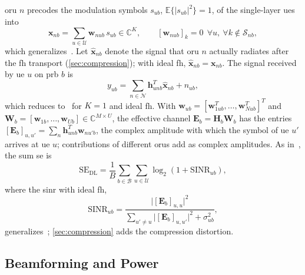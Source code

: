 \documentclass[10pt, final, journal, letterpaper, twocolumn]{IEEEtran}
\newcommand{\Nset}{\mathcal{N}}
\newcommand{\Uset}{\mathcal{U}}
\newcommand{\Bset}{\mathcal{B}}
\newcommand{\SINR}{\mathrm{SINR}}
\newcommand{\SE}{\mathrm{SE}}
\newcommand{\E}{\mathbb{E}}
\newcommand{\bh}{\mathbf{h}}
\newcommand{\bw}{\mathbf{w}}
\newcommand{\bx}{\mathbf{x}}
\newcommand{\bxh}{\hat{\mathbf{x}}}
\newcommand{\bH}{\mathbf{H}}
\newcommand{\bW}{\mathbf{W}}
\newcommand{\bE}{\mathbf{E}}
\begin{document}
\gls{oru} $n$ precodes the modulation symbols $s_{ub}$, $\E\{|s_{ub}|^2\} = 1$, of the single-layer \glspl{ue} into
\begin{equation}
  \bx_{nb} = \sum_{u \in \Uset} \bw_{nub}\, s_{ub} \in \mathbb{C}^{K}, \qquad
  [\bw_{nub}]_k = 0\ \ \forall u,\ \forall k \notin \mathcal{S}_{nb},
  \label{eq:tx}
\end{equation}
which generalizes~\cite[eq.~(2)]{girycki2024eucnc}. Let $\bxh_{nb}$ denote the signal that \gls{oru} $n$ actually radiates after the \gls{fh} transport (\cref{sec:compression}); with ideal \gls{fh}, $\bxh_{nb} = \bx_{nb}$. The signal received by \gls{ue} $u$ on \gls{prb} $b$ is
\begin{equation}
  y_{ub} = \sum_{n \in \Nset} \bh_{unb}^T \bxh_{nb} + n_{ub},
  \label{eq:rx}
\end{equation}
which reduces to~\cite[eq.~(3)]{girycki2024eucnc} for $K = 1$ and ideal \gls{fh}. With $\bw_{ub} = [\bw_{1ub}^T, \dots, \bw_{Nub}^T]^T$ and $\bW_b = [\bw_{1b}, \dots, \bw_{Ub}] \in \mathbb{C}^{M \times U}$, the effective channel $\bE_b = \bH_b \bW_b$ has the entries $[\bE_b]_{u,u'} = \sum_{n} \bh_{unb}^T \bw_{nu'b}$, the complex amplitude with which the symbol of \gls{ue} $u'$ arrives at \gls{ue} $u$; contributions of different \glspl{oru} add as complex amplitudes. As in~\cite[eq.~(5)]{girycki2024eucnc}, the sum \gls{se} is
\begin{equation}
  \SE_{\mathrm{DL}} = \frac{1}{B} \sum_{b \in \Bset} \sum_{u \in \Uset} \log_2(1 + \SINR_{ub}),
  \label{eq:se}
\end{equation}
where the \gls{sinr} with ideal \gls{fh},
\begin{equation}
  \SINR_{ub} = \frac{\big| [\bE_b]_{u,u} \big|^2}{\sum_{u' \neq u} \big| [\bE_b]_{u,u'} \big|^2 + \sigma_{ub}^2},
  \label{eq:sinr_ideal}
\end{equation}
generalizes~\cite[eq.~(4)]{girycki2024eucnc}; \cref{sec:compression} adds the compression distortion.

\subsection{Beamforming and Power}\label{sec:beamforming}
\end{document}
